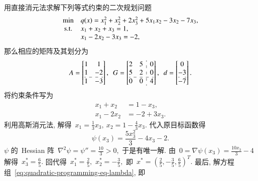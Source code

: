 \begin{exam}\label{eg:7.2.1}
用直接消元法求解下列等式约束的二次规划问题
\begin{equation*}
\begin{array}{cl}
\min & q({x}) = x_1^2 + x_2^2 + 2x_3^2 + 5x_1x_2 - 3x_2 - 7x_3, \\
{\rm s.t.} & x_1 + x_2 + x_3 = 1, \\
& x_1 - 2x_2 - 3x_3 = -2,
\end{array}
\end{equation*}
那么相应的矩阵及其划分为
\begin{equation*}
A = \left[\begin{array}{@{}cc@{}} 1 & 1 \\ 1 & -2 \\ \hdashline 1 & -3 \end{array}\right], ~~ G = \left[\begin{array}{@{}cc:c@{}} 2 & 5 & 0 \\ 5 & 2 & 0 \\ \hdashline 0 & 0 & 4 \end{array}\right], ~~ {d} = \left[\begin{array}{@{}c@{}} 0 \\ -3 \\ \hdashline -7 \end{array}\right].
\end{equation*}
将约束条件写为
\begin{equation*}
\begin{aligned}
x_1 + x_2 & = 1 - x_3, \\
x_1 - 2x_2 & = -2 + 3x_3.
\end{aligned}
\end{equation*}
利用高斯消元法, 解得~$x_1 = \frac{1}{3} x_3, ~ x_2 = 1 - \frac{4}{3} x_3.$ 代入原目标函数得
\begin{equation*}
\psi(x_3) = \frac{5 x_{3}^{2}}{3} - 4 x_{3} - 2.
\end{equation*}
$\psi$ 的~{\rm Hessian} 阵~$\nabla^2 \psi = \psi'' = \frac{10}{3} > 0,$ 于是有唯一解. 由~$0 = \nabla \psi (x_3) = \frac{10 x_{3}}{3} - 4$ 解得~$x_3^* = \frac{6}{5}.$ 回代得~$x_1^* = \frac{2}{5},$ $x_2^* = -\frac{3}{5},$ 即~${x}^* = \left( \frac{2}{5}, -\frac{3}{5}, \frac{6}{5} \right)^T.$ 最后, 解方程组~\eqref{eq:quadratic-programming-eq-lambda}, 即
\begin{equation*}

\end{equation*}
\end{exam}
